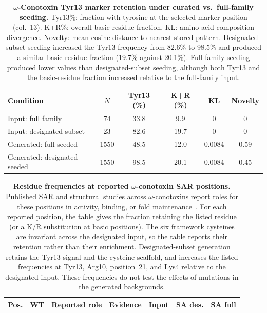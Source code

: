 \documentclass{article}
\theoremstyle{definition}
\theoremstyle{remark}
\begin{document}
\begin{table}[p]
  \centering
  \caption{\textbf{$\omega$-Conotoxin Tyr13 marker retention under curated vs.\
  full-family seeding.}
  Tyr13\%: fraction with tyrosine at the selected marker position (col.~13).
  K+R\%: overall basic-residue fraction. KL: amino acid composition
  divergence. Novelty: mean cosine distance to nearest stored pattern. Designated-subset seeding
  increased the Tyr13 frequency from 82.6\% to 98.5\% and produced a similar
  basic-residue fraction (19.7\% against 20.1\%). Full-family seeding produced lower values than
  designated-subset seeding, although both Tyr13 and the basic-residue fraction increased relative
  to the full-family input.}
  \label{tab:conotoxin-pharmacophore}
  \small
  \begin{tabular}{lccccc}
    \toprule
    Condition & $N$ & Tyr13 (\%) & K+R (\%) & KL & Novelty \\
    \midrule
    Input: full family          &   74 & 33.8 &  9.9 & 0      & 0 \\
    Input: designated subset    &   23 & 82.6 & 19.7 & 0      & 0 \\
    Generated: full-seeded      & 1550 & 48.5 & 12.0 & 0.0084 & 0.59 \\
    Generated: designated-seeded & 1550 & 98.5 & 20.1 & 0.0084 & 0.45 \\
    \bottomrule
  \end{tabular}
\end{table}

\begin{table}[ht]
  \caption{\textbf{Residue frequencies at reported $\omega$-conotoxin SAR positions.}
  Published SAR and structural studies across $\omega$-conotoxins report roles for
  these positions in activity, binding, or fold
  maintenance~\cite{kimTyr13Essential1995,satoBasicResidues1993,satoAlaScanMVIIC2000,schroederLys2Effects2012,lewisConotoxinSAR2012,schroederChiralityTyr131999}.
  For each reported position, the table gives the fraction retaining the listed residue
  (or a K/R substitution at basic positions). The six framework cysteines are invariant
  across the designated input, so the table reports their retention rather than their
  enrichment. Designated-subset generation retains the Tyr13 signal and the cysteine
  scaffold, and increases the listed frequencies at Tyr13, Arg10, position~21, and
  Lys4 relative to the designated input. These
  frequencies do not test the effects of mutations in the generated backgrounds.}
  \label{tab:sar-agreement}
  \centering
  \small
  \begin{tabular}{clllccc}
    \toprule
    Pos. & WT & Reported role & Evidence & Input & SA des. & SA full \\
    \midrule
    
  \end{tabular}
\end{table}
\end{document}
